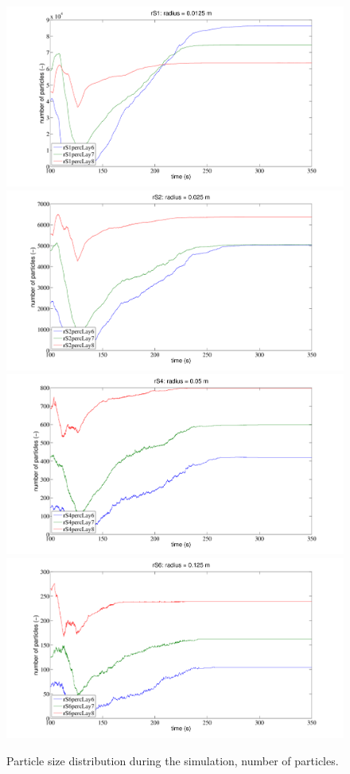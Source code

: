 \begin{figure}[htbp]
\centering 
  \subfloat%
  {
	  \includegraphics[width=.70\columnwidth]{114rS120151111151255}
	  \label{fig:114rS120151111151255}
  }
  \\
    \subfloat
    {
	  \includegraphics[width=.70\columnwidth]{116rS220151111151255}
	  \label{fig:116rS220151111151255}
  }
  \\
  \subfloat%
  {
	  \includegraphics[width=.70\columnwidth]{118rS420151111151255}
	  \label{fig:118rS420151111151255}
  }
  \\
    \subfloat%
    {
	  \includegraphics[width=.70\columnwidth]{120rS620151111151255}
	  \label{fig:120rS620151111151255}  }
  \\
  \caption{Particle size distribution during the simulation, number of
  particles.}
  \label{fig:096sinterplots}
\end{figure}